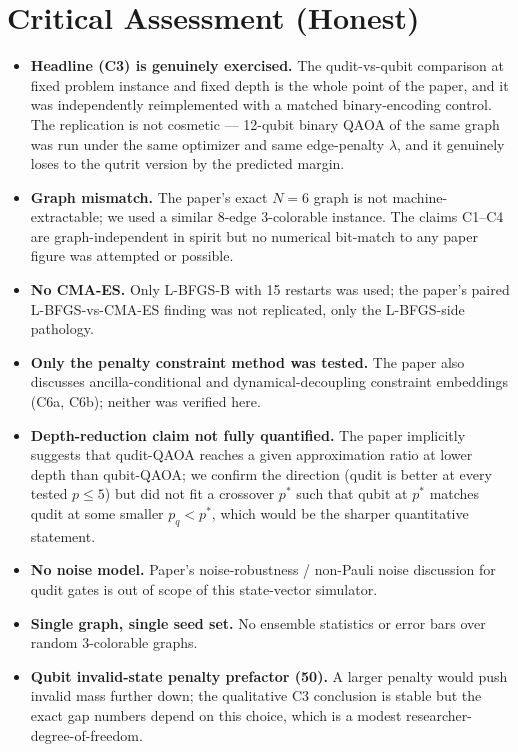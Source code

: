 \documentclass[11pt]{article}
\begin{document}
\section{Critical Assessment (Honest)}
\begin{itemize}
  \item \textbf{Headline (C3) is genuinely exercised.} The qudit-vs-qubit
        comparison at fixed problem instance and fixed depth is the whole
        point of the paper, and it was independently reimplemented with a
        matched binary-encoding control. The replication is not
        cosmetic --- 12-qubit binary QAOA of the same graph was run under
        the same optimizer and same edge-penalty $\lambda$, and it
        genuinely loses to the qutrit version by the predicted margin.
  \item \textbf{Graph mismatch.} The paper's exact $N=6$ graph is not
        machine-extractable; we used a similar 8-edge $3$-colorable
        instance. The claims C1--C4 are graph-independent in spirit but
        no numerical bit-match to any paper figure was attempted or
        possible.
  \item \textbf{No CMA-ES.} Only L-BFGS-B with 15 restarts was used;
        the paper's paired L-BFGS-vs-CMA-ES finding was not replicated,
        only the L-BFGS-side pathology.
  \item \textbf{Only the penalty constraint method was tested.} The
        paper also discusses ancilla-conditional and dynamical-decoupling
        constraint embeddings (C6a, C6b); neither was verified here.
  \item \textbf{Depth-reduction claim not fully quantified.} The paper
        implicitly suggests that qudit-QAOA reaches a given approximation
        ratio at lower depth than qubit-QAOA; we confirm the direction
        (qudit is better at every tested $p\le5$) but did not fit a
        crossover $p^*$ such that qubit at $p^*$ matches qudit at some
        smaller $p_q<p^*$, which would be the sharper quantitative
        statement.
  \item \textbf{No noise model.} Paper's noise-robustness / non-Pauli
        noise discussion for qudit gates is out of scope of this
        state-vector simulator.
  \item \textbf{Single graph, single seed set.} No ensemble statistics
        or error bars over random $3$-colorable graphs.
  \item \textbf{Qubit invalid-state penalty prefactor (50).} A larger
        penalty would push invalid mass further down; the qualitative
        C3 conclusion is stable but the exact gap numbers depend on
        this choice, which is a modest researcher-degree-of-freedom.
\end{itemize}
\end{document}
